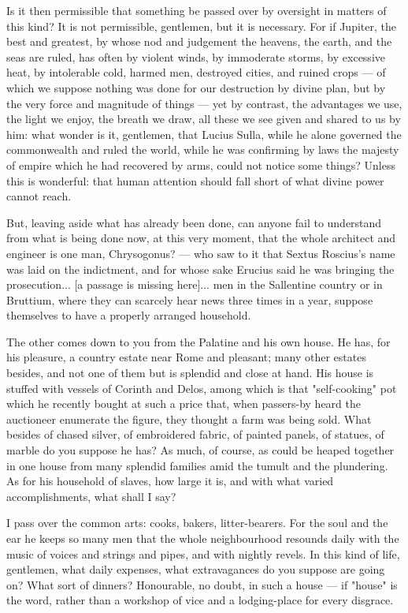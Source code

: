  Is it then permissible that something be passed over by oversight in matters of this kind? It is not permissible, gentlemen, but it is necessary. For if Jupiter, the best and greatest, by whose nod and judgement the heavens, the earth, and the seas are ruled, has often by violent winds, by immoderate storms, by excessive heat, by intolerable cold, harmed men, destroyed cities, and ruined crops --- of which we suppose nothing was done for our destruction by divine plan, but by the very force and magnitude of things --- yet by contrast, the advantages we use, the light we enjoy, the breath we draw, all these we see given and shared to us by him: what wonder is it, gentlemen, that Lucius Sulla, while he alone governed the commonwealth and ruled the world, while he was confirming by laws the majesty of empire which he had recovered by arms, could not notice some things? Unless this is wonderful: that human attention should fall short of what divine power cannot reach.

 But, leaving aside what has already been done, can anyone fail to understand from what is being done now, at this very moment, that the whole architect and engineer is one man, Chrysogonus? --- who saw to it that Sextus Roscius's name was laid on the indictment, and for whose sake Erucius said he was bringing the prosecution... [a passage is missing here]... men in the Sallentine country or in Bruttium, where they can scarcely hear news three times in a year, suppose themselves to have a properly arranged household.

 The other comes down to you from the Palatine and his own house. He has, for his pleasure, a country estate near Rome and pleasant; many other estates besides, and not one of them but is splendid and close at hand. His house is stuffed with vessels of Corinth and Delos, among which is that "self-cooking" pot which he recently bought at such a price that, when passers-by heard the auctioneer enumerate the figure, they thought a farm was being sold. What besides of chased silver, of embroidered fabric, of painted panels, of statues, of marble do you suppose he has? As much, of course, as could be heaped together in one house from many splendid families amid the tumult and the plundering. As for his household of slaves, how large it is, and with what varied accomplishments, what shall I say?

 I pass over the common arts: cooks, bakers, litter-bearers. For the soul and the ear he keeps so many men that the whole neighbourhood resounds daily with the music of voices and strings and pipes, and with nightly revels. In this kind of life, gentlemen, what daily expenses, what extravagances do you suppose are going on? What sort of dinners? Honourable, no doubt, in such a house --- if "house" is the word, rather than a workshop of vice and a lodging-place for every disgrace.

